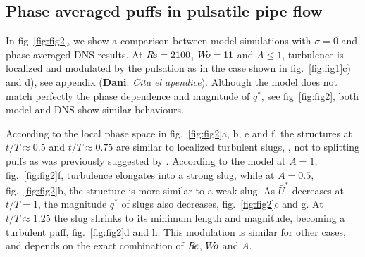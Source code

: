 \documentclass{article}
\DeclareRobustCommand{\dm}[1]{{\color{blue}(\textbf{Dani}: \textit{#1}\xspace)}}
\DeclareRobustCommand{\Reynolds}{\ensuremath{R\hspace{-0.1em}e}\xspace}     %
\DeclareRobustCommand{\Womersley}{\ensuremath{W\hspace{-0.25em}o}\xspace}    %
\DeclareRobustCommand{\Amplitude}{\ensuremath{A}\xspace}    %
\begin{document}
\subsection{Phase averaged puffs in pulsatile pipe flow}
In fig~\ref{fig:fig2}, we show a comparison between model simulations with $\sigma=0$ and phase averaged DNS results. At $\Reynolds=2100$, $\Womersley=11$ and $\Amplitude\leq 1$, turbulence is localized and modulated by the pulsation as in the case shown in fig.~\ref{fig:fig1}c) and d), see appendix \dm{Cita el apendice}. Although the model does not match perfectly the phase dependence and magnitude of $q^{*}$, see fig~\ref{fig:fig2}, both model and DNS show similar behaviours.

According to the local phase space in fig.~\ref{fig:fig2}a, b, e and f, the structures at $t/T\approx0.5$ and $t/T\approx0.75$ are similar to localized turbulent slugs, \cite{Song2017,barkley2016}, not to splitting puffs as was previously suggested by \cite{entropy2021}. According to the model at $\Amplitude=1$, fig.~\ref{fig:fig2}f, turbulence elongates into a strong slug, while at $\Amplitude=0.5$, fig.~\ref{fig:fig2}b, the structure is more similar to a weak slug. As $\bar{U}^{*}$ decreases at $t/T=1$, the magnitude $q^{*}$ of slugs also decreases, fig.~\ref{fig:fig2}c and g. At $t/T\approx 1.25$ the slug shrinks to its minimum length and magnitude, becoming a turbulent puff, fig.~\ref{fig:fig2}d and h. This modulation is similar for other cases, and depends on the exact combination of \Reynolds, \Womersley and \Amplitude.





\end{document}
